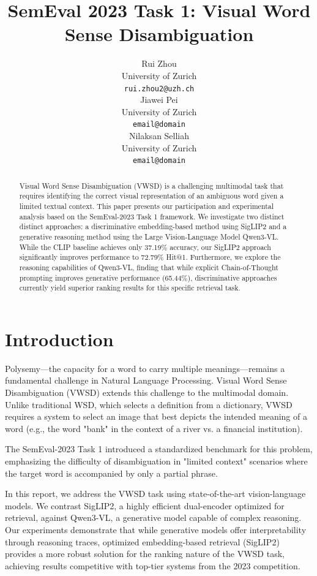 \documentclass[11pt]{article}
\title{SemEval 2023 Task 1: Visual Word Sense Disambiguation}
\author{Rui Zhou \\
  University of Zurich\\
  \texttt{rui.zhou2@uzh.ch} \\\And
  Jiawei Pei \\
  University of Zurich\\
  \texttt{email@domain} \\\And
  Nilaksan Selliah \\
  University of Zurich\\
  \texttt{email@domain} \\}
\begin{document}
\maketitle
\begin{abstract}
Visual Word Sense Disambiguation (VWSD) is a challenging multimodal task that requires identifying the correct visual representation of an ambiguous word given a limited textual context. This paper presents our participation and experimental analysis based on the SemEval-2023 Task 1 framework. We investigate two distinct distinct approaches: a discriminative embedding-based method using SigLIP2 and a generative reasoning method using the Large Vision-Language Model Qwen3-VL. While the CLIP baseline achieves only 37.19\% accuracy, our SigLIP2 approach significantly improves performance to 72.79\% Hit@1. Furthermore, we explore the reasoning capabilities of Qwen3-VL, finding that while explicit Chain-of-Thought prompting improves generative performance (65.44\%), discriminative approaches currently yield superior ranking results for this specific retrieval task.
\end{abstract}

\section{Introduction}
Polysemy—the capacity for a word to carry multiple meanings—remains a fundamental challenge in Natural Language Processing. Visual Word Sense Disambiguation (VWSD) extends this challenge to the multimodal domain. Unlike traditional WSD, which selects a definition from a dictionary, VWSD requires a system to select an image that best depicts the intended meaning of a word (e.g., the word "bank" in the context of a river vs. a financial institution).

The SemEval-2023 Task 1 \cite{raganato2023semeval} introduced a standardized benchmark for this problem, emphasizing the difficulty of disambiguation in "limited context" scenarios where the target word is accompanied by only a partial phrase. 

In this report, we address the VWSD task using state-of-the-art vision-language models. We contrast SigLIP2, a highly efficient dual-encoder optimized for retrieval, against Qwen3-VL, a generative model capable of complex reasoning. Our experiments demonstrate that while generative models offer interpretability through reasoning traces, optimized embedding-based retrieval (SigLIP2) provides a more robust solution for the ranking nature of the VWSD task, achieving results competitive with top-tier systems from the 2023 competition.
\end{document}
